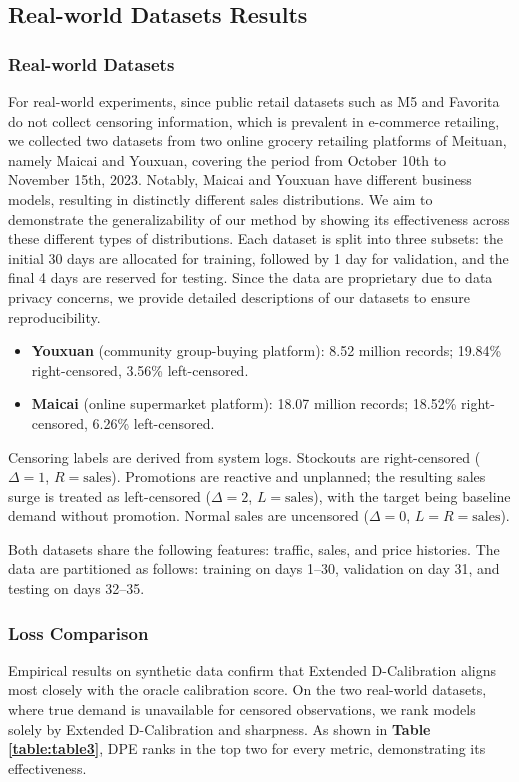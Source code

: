 \documentclass[sigconf]{acmart}
\begin{document}
\subsection{Real-world Datasets Results}
\subsubsection{Real-world Datasets}
For real-world experiments, since public retail datasets such as M5 and Favorita do not collect censoring information, which is prevalent in e-commerce retailing, we collected two datasets from two online grocery retailing platforms of Meituan, namely Maicai and Youxuan, covering the period from October 10th to November 15th, 2023. Notably, Maicai and Youxuan have different business models, resulting in distinctly different sales distributions. We aim to demonstrate the generalizability of our method by showing its effectiveness across these different types of distributions. Each dataset is split into three subsets: the initial 30 days are allocated for training, followed by 1 day for validation, and the final 4 days are reserved for testing. Since the data are proprietary due to data privacy concerns, we provide detailed descriptions of our datasets to ensure reproducibility.
\begin{itemize}
\item \textbf{Youxuan} (community group-buying platform): 8.52 million records; 19.84\% right-censored, 3.56\% left-censored.
\item \textbf{Maicai} (online supermarket platform): 18.07 million records; 18.52\% right-censored, 6.26\% left-censored.
\end{itemize}

Censoring labels are derived from system logs. Stockouts are 
right-censored ($\Delta=1$, $R=\text{sales}$). Promotions are 
reactive and unplanned; the resulting sales surge is treated 
as left-censored ($\Delta=2$, $L=\text{sales}$), with the 
target being baseline demand without promotion. Normal sales 
are uncensored ($\Delta=0$, $L=R=\text{sales}$).


Both datasets share the following features: traffic, sales, and price histories. The data are partitioned as follows: training on days 1–30, validation on day 31, and testing on days 32–35.

\subsubsection{Loss Comparison}
Empirical results on synthetic data confirm that Extended D-Calibration aligns most closely with the oracle calibration score. On the two real-world datasets, where true demand is unavailable for censored observations, we rank models solely by Extended D-Calibration and sharpness. As shown in \textbf{Table \ref{table:table3}}, DPE ranks in the top two for every metric, demonstrating its effectiveness.
\end{document}
